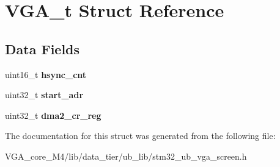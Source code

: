 \hypertarget{struct_v_g_a__t}{}\section{V\+G\+A\+\_\+t Struct Reference}
\label{struct_v_g_a__t}
\subsection*{Data Fields}
\begin{DoxyCompactItemize}
\item 
uint16\+\_\+t {\bfseries hsync\+\_\+cnt}\hypertarget{struct_v_g_a__t_a649bc185f93377aec7fa1c136dd2add0}{}\label{struct_v_g_a__t_a649bc185f93377aec7fa1c136dd2add0}

\item 
uint32\+\_\+t {\bfseries start\+\_\+adr}\hypertarget{struct_v_g_a__t_a7f47a855ae47844b419d75797f00fbbb}{}\label{struct_v_g_a__t_a7f47a855ae47844b419d75797f00fbbb}

\item 
uint32\+\_\+t {\bfseries dma2\+\_\+cr\+\_\+reg}\hypertarget{struct_v_g_a__t_a1fc3c1405cc22f5d4fc21eb58c47c06a}{}\label{struct_v_g_a__t_a1fc3c1405cc22f5d4fc21eb58c47c06a}

\end{DoxyCompactItemize}


The documentation for this struct was generated from the following file\+:\begin{DoxyCompactItemize}
\item 
V\+G\+A\+\_\+core\+\_\+\+M4/lib/data\+\_\+tier/ub\+\_\+lib/stm32\+\_\+ub\+\_\+vga\+\_\+screen.\+h\end{DoxyCompactItemize}
